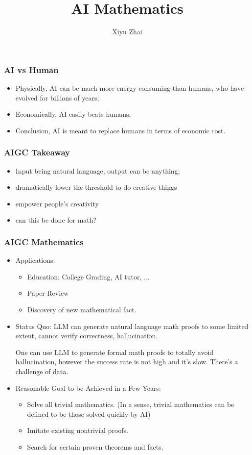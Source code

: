 \documentclass{beamer}   	%
\title{AI Mathematics}
\author{Xiyu Zhai}
\date{}							%
\theoremstyle{definition}
\begin{document}
\maketitle

\begin{frame}
\frametitle{AI vs Human}
\begin{itemize}
	\item Physically, AI can be much more energy-consuming than humans, who have evolved for billions of years;
	\item Economically, AI easily beats humans;
	\item Conclusion, AI is meant to replace humans in terms of economic cost.
\end{itemize}
\end{frame}

\begin{frame}
\frametitle{AIGC Takeaway}
\begin{itemize}
	\item Input being natural language, output can be anything;
	\item dramatically lower the threshold to do creative things
	\item empower people's creativity
	\item can this be done for math?
\end{itemize}
\end{frame}

\begin{frame}
\frametitle{AIGC Mathematics}
\begin{itemize}
	\item Applications:
		\begin{itemize}
			\item Education: College Grading, AI tutor, ...
			\item Paper Review
			\item Discovery of new mathematical fact.
		\end{itemize}
	\item Status Quo: LLM can generate natural language math proofs to some limited extent, cannot verify correctness, hallucination.

	One can use LLM to generate formal math proofs to totally avoid hallucination, however the success rate is not high and it's slow. There's a challenge of data.
	\item Reasonable Goal to be Achieved in a Few Years:
	\begin{itemize}
		\item Solve all trivial mathematics. (In a sense, trivial mathematics can be defined to be those solved quickly by AI)
		\item Imitate existing nontrivial proofs.
		\item Search for certain proven theorems and facts.
	\end{itemize}
\end{itemize}
\end{frame}
\end{document}
